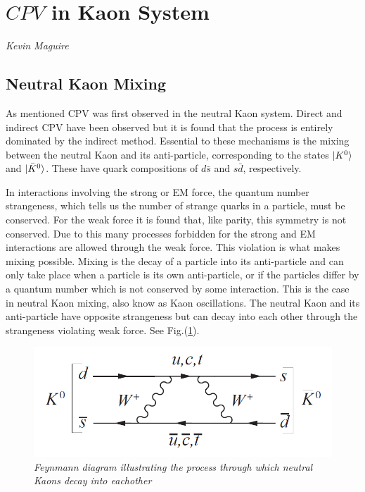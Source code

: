 \section{$CPV$ in Kaon System} 
\vspace{-1.0em}
\begin{center}
\tiny{\textit{Kevin Maguire}}
\end{center}

\subsection{Neutral Kaon Mixing}

As mentioned CPV was first observed in the neutral Kaon system. Direct and indirect CPV have been observed but it is found that the process is entirely dominated by the indirect method. Essential to these mechanisms is the mixing between the neutral Kaon and its anti-particle, corresponding to the states $\ket{K^{0}}$ and $\ket{\bar{K}^{0}}$. These have quark compositions of $d \bar{s}$ and $s \bar{d}$, respectively. 

In interactions involving the strong or EM force, the quantum number strangeness, which tells us the number of strange quarks in a particle, must be conserved. For the weak force it is found that, like parity, this symmetry is not conserved. Due to this many processes forbidden for the strong and EM interactions are allowed through the weak force. This violation is what makes mixing possible. Mixing is the decay of a particle into its anti-particle and can only take place when a particle is its own anti-particle, or if the particles differ by a quantum number which is not conserved by some interaction. This is the case in neutral Kaon mixing, also know as Kaon oscillations. The neutral Kaon and its anti-particle have opposite strangeness but can decay into each other through the strangeness violating weak force. See Fig.(\ref{KaonMixinFeyn}). 

\begin{figure}[h!]
\begin{center}
\includegraphics[scale=0.4]{figs/KevFeyn1.png}
\end{center}
\caption{\textit{Feynmann diagram illustrating the process through which neutral Kaons decay into eachother}}
\label{KaonMixinFeyn}
\end{figure}

